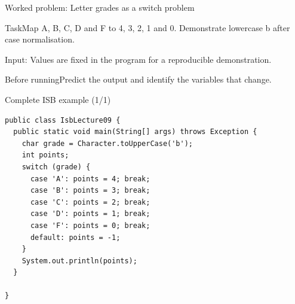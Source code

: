 \documentclass[10pt,aspectratio=169]{beamer}
\begin{document}
\begin{frame}[fragile,t]{Worked problem: Letter grades as a switch problem}
\begin{block}{Task}Map A, B, C, D and F to 4, 3, 2, 1 and 0. Demonstrate lowercase b after case normalisation.\end{block}
\small Input: Values are fixed in the program for a reproducible demonstration.\par\vspace{3mm}\begin{exampleblock}{Before running}Predict the output and identify the variables that change.\end{exampleblock}
\end{frame}

\begin{frame}[fragile,t]{Complete ISB example (1/1)}
\begin{lstlisting}
public class IsbLecture09 {
  public static void main(String[] args) throws Exception {
    char grade = Character.toUpperCase('b');
    int points;
    switch (grade) {
      case 'A': points = 4; break;
      case 'B': points = 3; break;
      case 'C': points = 2; break;
      case 'D': points = 1; break;
      case 'F': points = 0; break;
      default: points = -1;
    }
    System.out.println(points);
  }

}
\end{lstlisting}
\end{frame}
\end{document}
